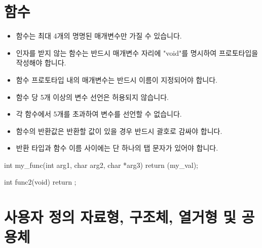 \documentclass{42-ko}
\begin{document}
    \section{함수}

        \begin{itemize}

            \item 함수는 최대 4개의 명명된 매개변수만 가질 수 있습니다.

            \item 인자를 받지 않는 함수는 반드시 매개변수 자리에 "void"를 명시하여
              프로토타입을 작성해야 합니다.

            \item 함수 프로토타입 내의 매개변수는 반드시 이름이 지정되어야 합니다.

            \item 함수 당 5개 이상의 변수 선언은 허용되지 않습니다.

            \item 각 함수에서 5개를 초과하여 변수를 선언할 수 없습니다.

            \item 함수의 반환값은 반환할 값이 있을 경우 반드시 괄호로 감싸야 합니다.

            \item 반환 타입과 함수 이름 사이에는 단 하나의 탭 문자가 있어야 합니다.
       
        \end{itemize}

\vspace{1cm}

            \begin{42ccode}
int my_func(int arg1, char arg2, char *arg3)
{
    return (my_val);
}

int func2(void)
{
    return ;
}
            \end{42ccode}

        \newpage


    \section{사용자 정의 자료형, 구조체, 열거형 및 공용체}
\end{document}
